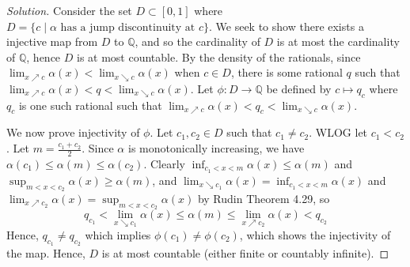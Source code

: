\documentclass{article}
\newcommand{\Q}{{\mathbb Q}}
\begin{document}
\begin{proof}[Solution]\let\qed\relax
	Consider the set $D\subset [0,1]$ where
	$D = \{c \mid \alpha \text{ has a jump discontinuity at }c\}$.
	We seek to show there exists a injective map from $D$ to $\Q$,
	and so the cardinality of $D$ is at most the cardinality of $\Q$,
	hence $D$ is at most countable.
	By the density of the rationals, since 
	$\lim_{x\nearrow c}\alpha(x) < \lim_{x\searrow c}\alpha(x)$ when $c \in D$,
	there is some rational $q$ such that
	$\lim_{x\nearrow c}\alpha(x) < q < \lim_{x\searrow c}\alpha(x)$.
	Let $\phi \colon D \to \Q$ be defined by $c \mapsto q_c$
	where $q_c$ is one such rational such that 
	$\lim_{x\nearrow c}\alpha(x) < q_c < \lim_{x\searrow c}\alpha(x)$.

	We now prove injectivity of $\phi$.
	Let $c_1,c_2 \in D$ such that $c_1 \neq c_2$.
	WLOG let $c_1 < c_2$.
	Let $m = \frac{c_1+c_2}{2}$.
	Since $\alpha$ is monotonically increasing, we have
	$\alpha(c_1) \leq \alpha(m) \leq \alpha(c_2)$.
	Clearly $\inf_{c_1<x<m}\alpha(x) \leq \alpha(m)$
	and $\sup_{m<x<c_2}\alpha(x) \geq \alpha(m)$,
	and $\lim_{x\searrow c_1}\alpha(x) = \inf_{c_1<x<m}\alpha(x)$
	and $\lim_{x\nearrow c_2}\alpha(x) = \sup_{m<x<c_2}\alpha(x)$ by Rudin Theorem 4.29,
	so
	\[
		q_{c_1} < \lim_{x\searrow c_1}\alpha(x) \leq \alpha(m) \leq \lim_{x\nearrow c_2}\alpha(x) < q_{c_2}
	\]
	Hence, $q_{c_1} \neq q_{c_2}$ which implies $\phi(c_1) \neq \phi(c_2)$,
	which shows the injectivity of the map.
	Hence, $D$ is at most countable (either finite or countably infinite).
\end{proof}
\end{document}
